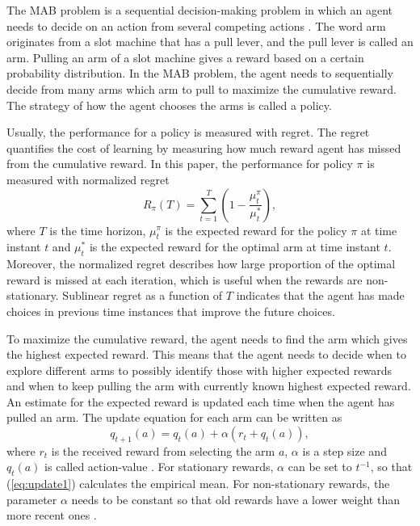 \documentclass[conference]{IEEEtran}
\begin{document}
The MAB problem is a sequential decision-making problem in which an agent needs to decide on an action from several competing actions \cite{Sutton2018}.
The word arm originates from a slot machine that has a pull lever, and the pull lever is called an arm.
Pulling an arm of a slot machine gives a reward based on a certain probability distribution.
In the MAB problem, the agent needs to sequentially decide from many arms which arm to pull to maximize the cumulative reward.
The strategy of how the agent chooses the arms is called a policy.

Usually, the performance for a policy is measured with regret.
The regret quantifies the cost of learning by measuring how much reward agent has missed from the cumulative reward.
In this paper, the performance for policy $\pi$ is measured with normalized regret
\begin{equation}\label{eq:reg}
    R_\pi(T) = \sum_{t=1}^T \left( 1 - \frac{\mu^\pi_t}{\mu^*_t} \right),
\end{equation}
where $T$ is the time horizon, $\mu^\pi_t$ is the expected reward for the policy $\pi$ at time instant $t$ and $\mu_t^*$ is the expected reward for the optimal arm at time instant $t$.
Moreover, the normalized regret describes how large proportion of the optimal reward is missed at each iteration, which is useful when the rewards are non-stationary.
Sublinear regret as a function of $T$ indicates that the agent has made choices in previous time instances that improve the future choices.

To maximize the cumulative reward, the agent needs to find the arm which gives the highest expected reward.
This means that the agent needs to decide when to explore different arms to possibly identify those with higher expected rewards 
and when to keep pulling the arm with currently known highest expected reward.
An estimate for the expected reward is updated each time when the agent has pulled an arm.
The update equation for each arm can be written as
\begin{equation}\label{eq:update1}
    q_{t+1}(a) = q_{t}(a) + \alpha \left(r_t + q_{t}(a)\right),
\end{equation}
where $r_t$ is the received reward from selecting the arm $a$, $\alpha$ is a step size and $q_{t}(a)$ is called action-value \cite{Sutton2018}.
For stationary rewards, $\alpha$ can be set to $t^{-1}$, so that (\ref{eq:update1}) calculates the empirical mean. 
For non-stationary rewards, the parameter $\alpha$ needs to be constant so that old rewards have a lower weight than more recent ones \cite{Sutton2018}.
\end{document}

